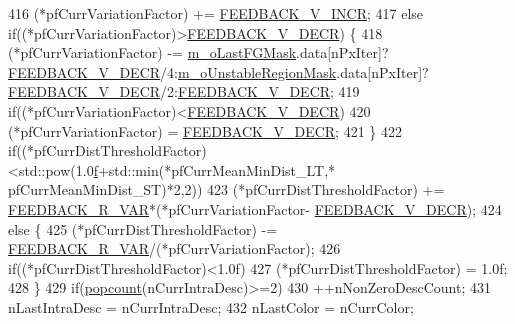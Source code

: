 \begin{DoxyCode}
416                 (*pfCurrVariationFactor) += \mbox{\hyperlink{_background_subtractor_su_b_s_e_n_s_e_8cpp_a55f10981362bbf2c494e76d1b8002255}{FEEDBACK\_V\_INCR}};
417             \textcolor{keywordflow}{else} \textcolor{keywordflow}{if}((*pfCurrVariationFactor)>\mbox{\hyperlink{_background_subtractor_su_b_s_e_n_s_e_8cpp_a9acb8c94db1a579c5404b3f03fe986b5}{FEEDBACK\_V\_DECR}}) \{
418                 (*pfCurrVariationFactor) -= \mbox{\hyperlink{class_background_subtractor_l_b_s_p_adb6dc0af596c5592c91f9d8faa5c8a4b}{m\_oLastFGMask}}.data[nPxIter]?
      \mbox{\hyperlink{_background_subtractor_su_b_s_e_n_s_e_8cpp_a9acb8c94db1a579c5404b3f03fe986b5}{FEEDBACK\_V\_DECR}}/4:\mbox{\hyperlink{class_background_subtractor_su_b_s_e_n_s_e_acfaf4c3c5aedbed8bd302444b4a4f8dd}{m\_oUnstableRegionMask}}.data[nPxIter]?
      \mbox{\hyperlink{_background_subtractor_su_b_s_e_n_s_e_8cpp_a9acb8c94db1a579c5404b3f03fe986b5}{FEEDBACK\_V\_DECR}}/2:\mbox{\hyperlink{_background_subtractor_su_b_s_e_n_s_e_8cpp_a9acb8c94db1a579c5404b3f03fe986b5}{FEEDBACK\_V\_DECR}};
419                 \textcolor{keywordflow}{if}((*pfCurrVariationFactor)<\mbox{\hyperlink{_background_subtractor_su_b_s_e_n_s_e_8cpp_a9acb8c94db1a579c5404b3f03fe986b5}{FEEDBACK\_V\_DECR}})
420                     (*pfCurrVariationFactor) = \mbox{\hyperlink{_background_subtractor_su_b_s_e_n_s_e_8cpp_a9acb8c94db1a579c5404b3f03fe986b5}{FEEDBACK\_V\_DECR}};
421             \}
422             \textcolor{keywordflow}{if}((*pfCurrDistThresholdFactor)<std::pow(1.0\mbox{\hyperlink{rings_8cpp_a77369fc4d5326a16d2c603e032023528}{f}}+std::min(*pfCurrMeanMinDist\_LT,*
      pfCurrMeanMinDist\_ST)*2,2))
423                 (*pfCurrDistThresholdFactor) += \mbox{\hyperlink{_background_subtractor_su_b_s_e_n_s_e_8cpp_a4c9d9560115af87b00cdd28d4dee178a}{FEEDBACK\_R\_VAR}}*(*pfCurrVariationFactor-
      \mbox{\hyperlink{_background_subtractor_su_b_s_e_n_s_e_8cpp_a9acb8c94db1a579c5404b3f03fe986b5}{FEEDBACK\_V\_DECR}});
424             \textcolor{keywordflow}{else} \{
425                 (*pfCurrDistThresholdFactor) -= \mbox{\hyperlink{_background_subtractor_su_b_s_e_n_s_e_8cpp_a4c9d9560115af87b00cdd28d4dee178a}{FEEDBACK\_R\_VAR}}/(*pfCurrVariationFactor);
426                 \textcolor{keywordflow}{if}((*pfCurrDistThresholdFactor)<1.0f)
427                     (*pfCurrDistThresholdFactor) = 1.0f;
428             \}
429             \textcolor{keywordflow}{if}(\mbox{\hyperlink{_distance_utils_8h_a4a3115575087346e42d27f3a95c753d8}{popcount}}(nCurrIntraDesc)>=2)
430                 ++nNonZeroDescCount;
431             nLastIntraDesc = nCurrIntraDesc;
432             nLastColor = nCurrColor;

\end{DoxyCode}
